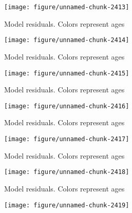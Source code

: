 \documentclass[a4paper]{article}\usepackage{graphicx, color}
\makeatletter
\def\maxwidth{ %
  \ifdim\Gin@nat@width>\linewidth
    \linewidth
  \else
    \Gin@nat@width
  \fi
}
\newenvironment{knitrout}{}{} %
\makeatother
\begin{document}
\begin{knitrout}
\begin{figure}[H]
{\centering \texttt{[image: figure/unnamed-chunk-2413]} 

}

\caption[Model residuals]{Model residuals. Colors represent ages\label{fig:unnamed-chunk-2413}}
\end{figure}
\begin{figure}[H]


{\centering \texttt{[image: figure/unnamed-chunk-2414]} 

}

\caption[Model residuals]{Model residuals. Colors represent ages\label{fig:unnamed-chunk-2414}}
\end{figure}
\begin{figure}[H]


{\centering \texttt{[image: figure/unnamed-chunk-2415]} 

}

\caption[Model residuals]{Model residuals. Colors represent ages\label{fig:unnamed-chunk-2415}}
\end{figure}
\begin{figure}[H]


{\centering \texttt{[image: figure/unnamed-chunk-2416]} 

}

\caption[Model residuals]{Model residuals. Colors represent ages\label{fig:unnamed-chunk-2416}}
\end{figure}
\begin{figure}[H]


{\centering \texttt{[image: figure/unnamed-chunk-2417]} 

}

\caption[Model residuals]{Model residuals. Colors represent ages\label{fig:unnamed-chunk-2417}}
\end{figure}
\begin{figure}[H]


{\centering \texttt{[image: figure/unnamed-chunk-2418]} 

}

\caption[Model residuals]{Model residuals. Colors represent ages\label{fig:unnamed-chunk-2418}}
\end{figure}
\begin{figure}[H]


{\centering \texttt{[image: figure/unnamed-chunk-2419]} 

}


\end{figure}
\end{knitrout}
\end{document}

